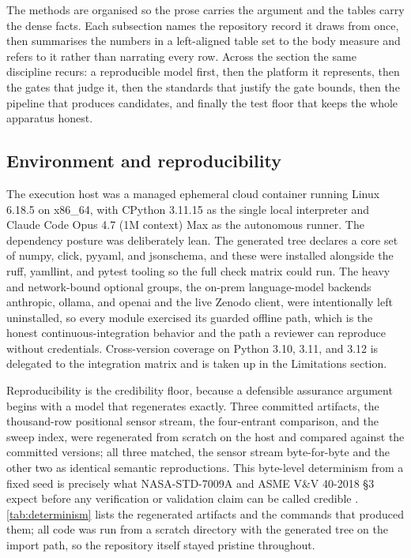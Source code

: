 
The methods are organised so the prose carries the argument and the tables carry
the dense facts. Each subsection names the repository record it draws from once,
then summarises the numbers in a left-aligned table set to the body measure and
refers to it rather than narrating every row. Across the section the same
discipline recurs: a reproducible model first, then the platform it represents,
then the gates that judge it, then the standards that justify the gate bounds,
then the pipeline that produces candidates, and finally the test floor that keeps
the whole apparatus honest.

\subsection{Environment and reproducibility}

The execution host was a managed ephemeral cloud container running Linux 6.18.5
on x86\_64, with CPython 3.11.15 as the single local interpreter and Claude Code
Opus 4.7 (1M context) Max as the autonomous runner. The dependency posture was
deliberately lean. The generated tree declares a core set of numpy, click,
pyyaml, and jsonschema, and these were installed alongside the ruff, yamllint,
and pytest tooling so the full check matrix could run. The heavy and
network-bound optional groups, the on-prem language-model backends anthropic,
ollama, and openai and the live Zenodo client, were intentionally left
uninstalled, so every module exercised its guarded offline path, which is the
honest continuous-integration behavior and the path a reviewer can reproduce
without credentials. Cross-version coverage on Python 3.10, 3.11, and 3.12 is
delegated to the integration matrix and is taken up in the Limitations section.

Reproducibility is the credibility floor, because a defensible assurance argument
begins with a model that regenerates exactly. Three committed artifacts, the
thousand-row positional sensor stream, the four-entrant comparison, and the sweep
index, were regenerated from scratch on the host and compared against the
committed versions; all three matched, the sensor stream byte-for-byte and the
other two as identical semantic reproductions. This byte-level determinism from a
fixed seed is precisely what NASA-STD-7009A and ASME V\&V 40-2018 \S3 expect
before any verification or validation claim can be called credible
\cite{nasastd7009a, asmevv40}. \autoref{tab:determinism} lists the regenerated
artifacts and the commands that produced them; all code was run from a scratch
directory with the generated tree on the import path, so the repository itself
stayed pristine throughout.

